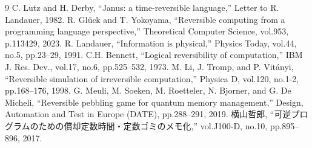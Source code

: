 \documentclass[a4paper,11pt]{jsarticle}
\begin{document}
\begin{thebibliography}{9}
 C. Lutz and H. Derby, ``Janus: a time-reversible language,''
Letter to R. Landauer, 1982.
 R. Gl\"uck and T. Yokoyama, ``Reversible computing from a
programming language perspective,'' Theoretical Computer Science, vol.953, p.113429, 2023.
 R. Landauer, ``Information is physical,'' Physics Today, vol.44, no.5,
pp.23--29, 1991.
 C.H. Bennett, ``Logical reversibility of computation,''
IBM J. Res. Dev., vol.17, no.6, pp.525--532, 1973.
 M. Li, J. Tromp, and P. Vit\'anyi, ``Reversible simulation of
irreversible computation,'' Physica D, vol.120, no.1-2, pp.168--176, 1998.
 G. Meuli, M. Soeken, M. Roetteler, N. Bjorner, and
G. De Micheli, ``Reversible pebbling game for quantum memory management,''
Design, Automation and Test in Europe (DATE), pp.288--291, 2019.
 横山哲郎, ``可逆プログラムのための償却定数時間・定数ゴミのメモ化,''
vol.J100-D, no.10, pp.895--896, 2017.
\end{thebibliography}
\end{document}
